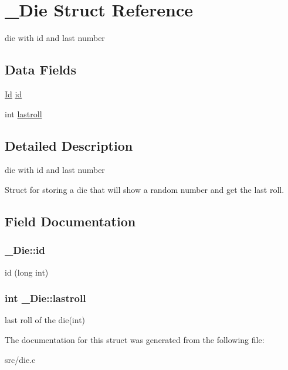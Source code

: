 \hypertarget{struct__Die}{}\section{\+\_\+\+Die Struct Reference}
\label{struct__Die}


die with id and last number  


\subsection*{Data Fields}
\begin{DoxyCompactItemize}
\item 
\hyperlink{types_8h_a845e604fb28f7e3d97549da3448149d3}{Id} \hyperlink{struct__Die_a0887af562dda760409957f13619d36f1}{id}
\item 
int \hyperlink{struct__Die_a208faa7e773152a3e2d5c4821d32593c}{lastroll}
\end{DoxyCompactItemize}


\subsection{Detailed Description}
die with id and last number 

Struct for storing a die that will show a random number and get the last roll. 

\subsection{Field Documentation}
\subsubsection[{\texorpdfstring{id}{id}}]{ \+\_\+\+Die\+::id}\hypertarget{struct__Die_a0887af562dda760409957f13619d36f1}{}\label{struct__Die_a0887af562dda760409957f13619d36f1}
id (long int) 
\subsubsection[{\texorpdfstring{lastroll}{lastroll}}]{\setlength{\rightskip}{0pt plus 5cm}int \+\_\+\+Die\+::lastroll}\hypertarget{struct__Die_a208faa7e773152a3e2d5c4821d32593c}{}\label{struct__Die_a208faa7e773152a3e2d5c4821d32593c}
last roll of the die(int) 

The documentation for this struct was generated from the following file\+:\begin{DoxyCompactItemize}
\item 
src/die.\+c\end{DoxyCompactItemize}
